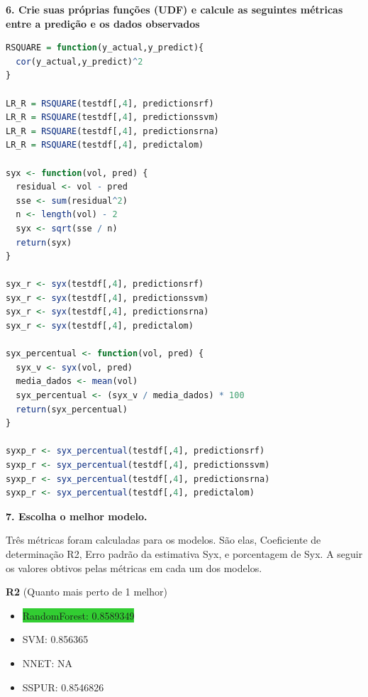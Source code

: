 \begin{adjustwidth}{1em}{}
\textbf{6. Crie suas próprias funções (UDF) e calcule as seguintes métricas entre a predição e os dados
observados}
\end{adjustwidth}
\begin{lstlisting}[language=R, style=input]
RSQUARE = function(y_actual,y_predict){
  cor(y_actual,y_predict)^2
}

LR_R = RSQUARE(testdf[,4], predictionsrf)
LR_R = RSQUARE(testdf[,4], predictionssvm)
LR_R = RSQUARE(testdf[,4], predictionsrna)
LR_R = RSQUARE(testdf[,4], predictalom)

syx <- function(vol, pred) {
  residual <- vol - pred
  sse <- sum(residual^2)
  n <- length(vol) - 2
  syx <- sqrt(sse / n)
  return(syx)
}

syx_r <- syx(testdf[,4], predictionsrf)
syx_r <- syx(testdf[,4], predictionssvm)
syx_r <- syx(testdf[,4], predictionsrna)
syx_r <- syx(testdf[,4], predictalom)

syx_percentual <- function(vol, pred) {
  syx_v <- syx(vol, pred)
  media_dados <- mean(vol)
  syx_percentual <- (syx_v / media_dados) * 100
  return(syx_percentual)
}

syxp_r <- syx_percentual(testdf[,4], predictionsrf)
syxp_r <- syx_percentual(testdf[,4], predictionssvm)
syxp_r <- syx_percentual(testdf[,4], predictionsrna)
syxp_r <- syx_percentual(testdf[,4], predictalom)
\end{lstlisting}

\begin{adjustwidth}{1em}{}
\textbf{7. Escolha o melhor modelo.}
\end{adjustwidth}

Três métricas foram calculadas para os modelos. São elas, Coeficiente de determinação R2, Erro padrão da estimativa Syx, e porcentagem de Syx. A seguir os valores obtivos pelas métricas em cada um dos modelos.\\

\begin{adjustwidth}{1.5em}{}
\textbf{R2} (Quanto mais perto de 1 melhor)
\end{adjustwidth}
\begin{itemize}
    \item \colorbox{LimeGreen}{RandomForest: 0.8589349}
    \item SVM: 0.856365
    \item NNET: NA
    \item SSPUR: 0.8546826
\end{itemize}


